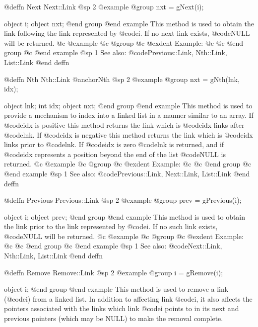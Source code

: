@deffn {Next} Next::Link
@sp 2
@example
@group
nxt = gNext(i);

object  i;
object  nxt;
@end group
@end example
This method is used to obtain the link following the link represented by
@code{i}.   If no next link exists, @code{NULL} will be returned.
@c @example
@c @group
@c @exdent Example:
@c 
@c @end group
@c @end example
@sp 1
See also:  @code{Previous::Link, Nth::Link, List::Link}
@end deffn




















@deffn {Nth} Nth::Link
@anchor{Nth}
@sp 2
@example
@group
nxt = gNth(lnk, idx);

object  lnk;
int     idx;
object  nxt;
@end group
@end example
This method is used to provide a mechanism to index into a linked list
in a manner similar to an array.  If @code{idx} is positive this method
returns the link which is @code{idx} links after @code{lnk}.  If @code{idx}
is negative this method returns the link which is @code{idx} links prior to
@code{lnk}.  If @code{idx} is zero @code{lnk} is returned, and if @code{idx}
represents a position beyond the end of the list @code{NULL} is returned.
@c @example
@c @group
@c @exdent Example:
@c 
@c @end group
@c @end example
@sp 1
See also:  @code{Previous::Link, Next::Link, List::Link}
@end deffn










@deffn {Previous} Previous::Link
@sp 2
@example
@group
prev = gPrevious(i);

object  i;
object  prev;
@end group
@end example
This method is used to obtain the link prior to the link represented by
@code{i}.  If no such link exists, @code{NULL} will be returned.
@c @example
@c @group
@c @exdent Example:
@c 
@c @end group
@c @end example
@sp 1
See also:  @code{Next::Link, Nth::Link, List::Link}
@end deffn







@deffn {Remove} Remove::Link
@sp 2
@example
@group
i = gRemove(i);

object  i;
@end group
@end example
This method is used to remove a link (@code{i}) from a linked list.  In
addition to affecting link @code{i}, it also affects the pointers
associated with the links which link @code{i} points to in its next and
previous pointers (which may be NULL) to make the removal complete.

